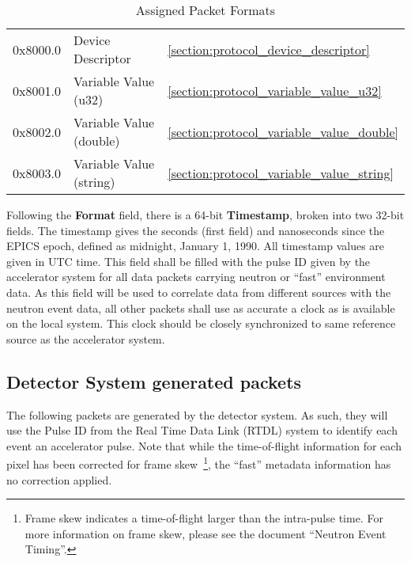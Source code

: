\begin{table}
\begin{center}
\begin{tabular}{l | l | l}
	0x8000.0 & Device Descriptor &
		\ref{section:protocol_device_descriptor} \\
	0x8001.0 & Variable Value (u32) &
		\ref{section:protocol_variable_value_u32} \\
	0x8002.0 & Variable Value (double) &
		\ref{section:protocol_variable_value_double} \\
	0x8003.0 & Variable Value (string) &
		\ref{section:protocol_variable_value_string} \\
    \end{tabular}
  \end{center}
  \caption {Assigned Packet Formats}
  \label{table:protocol_format_table}
\end{table}

Following the {\bf Format} field, there is a 64-bit {\bf Timestamp}, broken
into two 32-bit fields. The timestamp gives the seconds (first field) and
nanoseconds since the EPICS epoch, defined as midnight, January 1, 1990.  All
timestamp values are given in UTC time.  This field shall be filled with the
pulse ID given by the accelerator system for all data packets carrying neutron
or ``fast'' environment data. As this field will be used to correlate data from
different sources with the neutron event data, all other packets shall use as
accurate a clock as is available on the local system. This clock should be
closely synchronized to same reference source as the accelerator system.

\newpage
\subsection{Detector System generated packets}

The following packets are generated by the detector system. As such, they will
use the Pulse ID from the Real Time Data Link (RTDL) system to identify each
event an accelerator pulse. Note that while the time-of-flight information for
each pixel has been corrected for frame skew~\footnote{Frame skew indicates a
time-of-flight larger than the intra-pulse time.  For more information on frame
skew, please see the document ``Neutron Event Timing''.}, the ``fast'' metadata
information has no correction applied.


